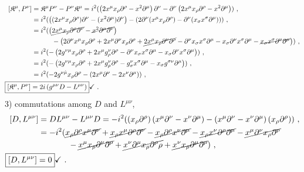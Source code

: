 \documentclass[12pt,a4paper]{report}
\begin{document}
\begin{align*}
    \left[\mathfrak{K}^{{\mu}},P^{{\nu}}\right]&=\mathfrak{K}^{{\mu}}P^{{\nu}}-P^{{\nu}}\mathfrak{K}^{{\mu}}=i^2(\left(2x^{{\mu}}x_{{\rho}}\partial^{{\rho}}-x^2\partial^{{\mu}}\right)\partial^{{\nu}}-\partial^{{\nu}}\left(2x^{{\mu}}x_{{\rho}}\partial^{{\rho}}-x^2\partial^{{\mu}}\right))~,\\
    &=i^2(\left((2x^{{\mu}}x_{{\rho}}\partial^{{\rho}})\partial^{{\nu}}-(x^2\partial^{{\mu}})\partial^{{\nu}}\right)-\left(2\partial^{{\nu}}(x^{{\mu}}x_{{\rho}}\partial^{{\rho}})-\partial^{{\nu}}(x_{{\sigma}}x^{{\sigma}}\partial^{{\mu}})\right))~,\\
    &=i^2(\left(\cancel{2x^{{\mu}}x_{{\rho}}\partial^{{\rho}}\partial^{{\nu}}}-\cancel{x^2\partial^{{\mu}}\partial^{{\nu}}}\right)\\
    &~~~~~~~~~-\left(2\partial^{{\nu}}x^{{\mu}}x_{{\rho}}\partial^{{\rho}}+2x^{{\mu}}\partial^{{\nu}}x_{{\rho}}\partial^{{\rho}}+\cancel{2x^{{\mu}}x_{{\rho}}\partial^{{\nu}}\partial^{{\rho}}}-\partial^{{\nu}}x_{{\sigma}}x^{{\sigma}}\partial^{{\mu}}-x_{{\sigma}}\partial^{{\nu}}x^{{\sigma}}\partial^{{\mu}}-\cancel{x_{{\sigma}}x^{{\sigma}}\partial^{{\nu}}\partial^{{\mu}}}\right))\nonumber~,\\
    &=i^2(-\left(2g^{{\nu}{\mu}}x_{{\rho}}\partial^{{\rho}}+2x^{{\mu}}g^{{\nu}}_{{\rho}}\partial^{{\rho}}-\partial^{{\nu}}x_{{\sigma}}x^{{\sigma}}\partial^{{\mu}}-x_{{\sigma}}\partial^{{\nu}}x^{{\sigma}}\partial^{{\mu}}\right))~,\\
    &=i^2(-\left(2g^{{\nu}{\mu}}x_{\rho}\partial^{{\rho}}+2x^{{\mu}}g^{{\nu}}_{{\rho}}\partial^{{\rho}}-g^{{\nu}}_{{\sigma}}x^{{\sigma}}\partial^{{\mu}}-x_{{\sigma}}g^{{\sigma}{\nu}}\partial^{{\mu}}\right))~,\\
    &=i^2(-2g^{{\nu}\hat{\mu}}x_{{\rho}}\partial^{{\rho}}-\left(2x^{{\mu}}\partial^{{\nu}}-2x^{{\nu}}\partial^{{\mu}}\right))~,\\
    \Aboxed{\left[\mathfrak{K}^{{\mu}},P^{{\nu}}\right]&=2i\left(g^{{\mu}{\nu}}D-L^{{\mu}{\nu}}\right)}\checkmark~.
\end{align*}
3) commutations among $D$ and $L^{{\mu}{\nu}}$,
\begin{align*}
    \left[D, L^{{\mu}{\nu}}\right]&=DL^{{\mu}{\nu}}-L^{{\mu}{\nu}}D=-i^2((x_{{\rho}}\partial^{{\rho}})\left(x^{{\mu}}\partial^{{\nu}}-x^{{\nu}}\partial^{{\mu}}\right)-\left(x^{{\mu}}\partial^{{\nu}}-x^{{\nu}}\partial^{{\mu}}\right)(x_{{\rho}}\partial^{{\rho}}))~,\\
    &=-i^2(\cancel{x_{{\rho}}\partial^{{\rho}}x^{{\mu}}\partial^{{\nu}}}+\cancel{x_{{\rho}}x^{{\mu}}\partial^{{\rho}}\partial^{{\nu}}}-\cancel{x_{{\rho}}\partial^{{\rho}}x^{{\nu}}\partial^{{\mu}}}-\cancel{x_{{\rho}}x^{{\nu}}\partial^{{\rho}}\partial^{{\mu}}}-\cancel{x^{{\mu}}\partial^{{\nu}}x_{{\rho}}\partial^{{\rho}}}\\
    &~~~~~~~~~~~-\cancel{x^{{\mu}}x_{{\rho}}\partial^{{\nu}}\partial^{{\rho}}}+\cancel{x^{{\nu}}\partial^{{\mu}}x_{{\rho}}\partial^{{\rho}}{{\rho}}}+\cancel{x^{{\nu}}x_{{\rho}}\partial^{{\mu}}\partial^{{\rho}}})\nonumber~,\\
    \Aboxed{\left[D, L^{{\mu}{\nu}}\right]&=0}\checkmark~.
\end{align*}
\end{document}
